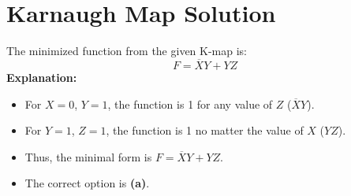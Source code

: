 \documentclass{article}
\begin{document}
\vspace{1cm}

\section*{Karnaugh Map Solution}
The minimized function from the given K-map is:
\[
F = \overline{X}Y + YZ
\]
\textbf{Explanation:}
\begin{itemize}
    \item For $X=0$, $Y=1$, the function is 1 for any value of $Z$ ($\overline{X}Y$).
    \item For $Y=1$, $Z=1$, the function is 1 no matter the value of $X$ ($YZ$).
    \item Thus, the minimal form is $F = \overline{X}Y + YZ$.
    \item The correct option is \textbf{(a)}.
\end{itemize}
\end{document}
